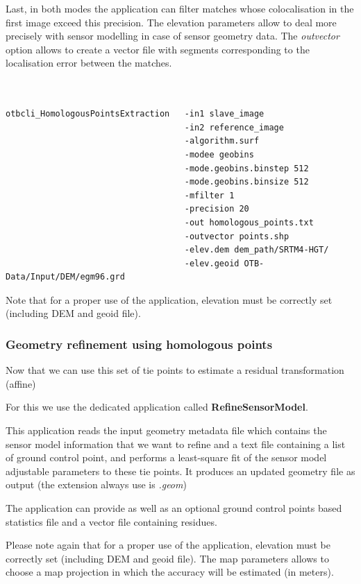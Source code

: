 Last, in both modes the application can filter matches whose colocalisation in
the first image exceed this precision. The elevation parameters allow to deal
more precisely with sensor modelling in case of sensor geometry data. The
\textit{outvector} option allows to create a vector file with segments
corresponding to the localisation error between the matches.

\begin{verbatim}


otbcli_HomologousPointsExtraction   -in1 slave_image
                                    -in2 reference_image
                                    -algorithm.surf
                                    -modee geobins
                                    -mode.geobins.binstep 512
                                    -mode.geobins.binsize 512
                                    -mfilter 1
                                    -precision 20  
                                    -out homologous_points.txt
                                    -outvector points.shp
                                    -elev.dem dem_path/SRTM4-HGT/ 
                                    -elev.geoid OTB-Data/Input/DEM/egm96.grd

\end{verbatim}

Note that for a proper use of the application, elevation must be correctly set
(including DEM and geoid file).

\subsubsection{Geometry refinement using homologous points}

Now that we can use this set of tie points to estimate a residual transformation (affine)  

For this we use the dedicated application called \textbf{RefineSensorModel}. 

This application reads the input geometry metadata file which contains the
sensor model information that we want to refine and a text file containing a
list of ground control point, and performs a least-square fit of the sensor
model adjustable parameters to these tie points. It produces an
updated geometry file as output (the extension always use is \textit{.geom})

The application can provide as well as an optional ground control points based
statistics file and a vector file containing residues.

Please note again that for a proper use of the application, elevation must be
correctly set (including DEM and geoid file). The map parameters allows to
choose a map projection in which the accuracy will be estimated (in meters).

